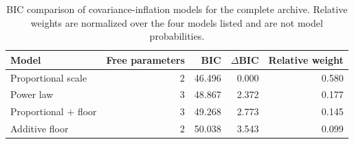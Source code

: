 \begin{table}[htbp]
\centering
\caption{BIC comparison of covariance-inflation models for the complete archive. Relative weights are normalized over the four models listed and are not model probabilities.}
\label{tab:bic}
\small
\begin{tabular}{lrrrr}
\toprule
Model & Free parameters & BIC & $\Delta$BIC & Relative weight \\
\midrule
Proportional scale & 2 & 46.496 & 0.000 & 0.580 \\
Power law & 3 & 48.867 & 2.372 & 0.177 \\
Proportional $+$ floor & 3 & 49.268 & 2.773 & 0.145 \\
Additive floor & 2 & 50.038 & 3.543 & 0.099 \\
\bottomrule
\end{tabular}
\end{table}
